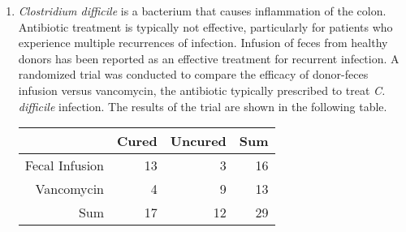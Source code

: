 \documentclass[letterpaper,12pt,twoside,]{pinp}
\begin{document}
\begin{enumerate}
\def\labelenumi{\arabic{enumi}.}
\setcounter{enumi}{4}
\item
  \textit{Clostridium difficile} is a bacterium that causes inflammation
  of the colon. Antibiotic treatment is typically not effective,
  particularly for patients who experience multiple recurrences of
  infection. Infusion of feces from healthy donors has been reported as
  an effective treatment for recurrent infection. A randomized trial was
  conducted to compare the efficacy of donor-feces infusion versus
  vancomycin, the antibiotic typically prescribed to treat
  \textit{C. difficile }infection. The results of the trial are shown in
  the following table.

  \begin{table}[h]
   \centering
   \begin{tabular}{rrr|r}
       \hline
       & Cured & Uncured & Sum \\ 
       \hline
       Fecal Infusion & 13 & 3 & 16 \\ 
       Vancomycin & 4 & 9 & 13 \\ 
       \hline
       Sum & 17 & 12 & 29 \\ 
       \hline
   \end{tabular}
   \end{table}


\end{enumerate}
\end{document}

